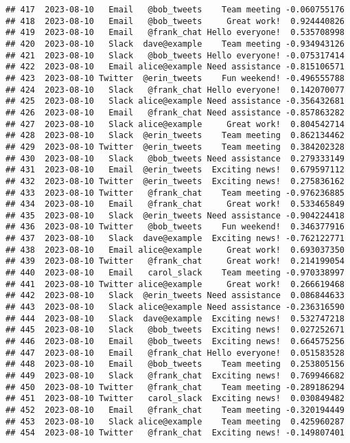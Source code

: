 \documentclass[
]{article}
\begin{document}
\begin{verbatim}
## 417  2023-08-10   Email   @bob_tweets    Team meeting -0.060755176
## 418  2023-08-10   Email   @bob_tweets     Great work!  0.924440826
## 419  2023-08-10   Email   @frank_chat Hello everyone!  0.535708998
## 420  2023-08-10   Slack  dave@example    Team meeting -0.934943126
## 421  2023-08-10   Slack   @bob_tweets Hello everyone! -0.075317414
## 422  2023-08-10   Email alice@example Need assistance -0.815106571
## 423  2023-08-10 Twitter  @erin_tweets    Fun weekend! -0.496555788
## 424  2023-08-10   Slack   @frank_chat Hello everyone!  0.142070077
## 425  2023-08-10   Slack alice@example Need assistance -0.356432681
## 426  2023-08-10   Email   @frank_chat Need assistance -0.857863282
## 427  2023-08-10   Slack alice@example     Great work!  0.804542714
## 428  2023-08-10   Slack  @erin_tweets    Team meeting  0.862134462
## 429  2023-08-10 Twitter  @erin_tweets    Team meeting  0.384202328
## 430  2023-08-10   Slack   @bob_tweets Need assistance  0.279333149
## 431  2023-08-10   Email  @erin_tweets  Exciting news!  0.679597112
## 432  2023-08-10 Twitter  @erin_tweets  Exciting news!  0.275836162
## 433  2023-08-10 Twitter   @frank_chat    Team meeting -0.976236885
## 434  2023-08-10   Email   @frank_chat     Great work!  0.533465849
## 435  2023-08-10   Slack  @erin_tweets Need assistance -0.904224418
## 436  2023-08-10 Twitter   @bob_tweets    Fun weekend!  0.346377916
## 437  2023-08-10   Slack  dave@example  Exciting news! -0.762122771
## 438  2023-08-10   Email alice@example     Great work!  0.693037350
## 439  2023-08-10 Twitter   @frank_chat     Great work!  0.214199054
## 440  2023-08-10   Email   carol_slack    Team meeting -0.970338997
## 441  2023-08-10 Twitter alice@example     Great work!  0.266619468
## 442  2023-08-10   Slack  @erin_tweets Need assistance  0.086844633
## 443  2023-08-10   Slack alice@example Need assistance -0.236316590
## 444  2023-08-10   Slack  dave@example  Exciting news!  0.532747218
## 445  2023-08-10   Slack   @bob_tweets  Exciting news!  0.027252671
## 446  2023-08-10   Email   @bob_tweets  Exciting news!  0.664575256
## 447  2023-08-10   Email   @frank_chat Hello everyone!  0.051583528
## 448  2023-08-10   Email   @bob_tweets    Team meeting  0.253805156
## 449  2023-08-10   Slack   @frank_chat  Exciting news!  0.769946682
## 450  2023-08-10 Twitter   @frank_chat    Team meeting -0.289186294
## 451  2023-08-10 Twitter   carol_slack  Exciting news!  0.030849482
## 452  2023-08-10   Email   @frank_chat    Team meeting -0.320194449
## 453  2023-08-10   Slack alice@example    Team meeting  0.425960287
## 454  2023-08-10 Twitter   @frank_chat  Exciting news! -0.149807401

\end{verbatim}
\end{document}
